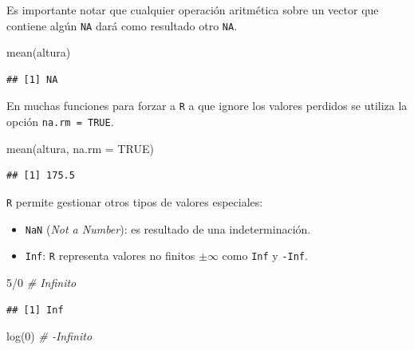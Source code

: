 \documentclass[
]{book}
\newenvironment{Shaded}{\begin{snugshade}}{\end{snugshade}}
\newcommand{\AttributeTok}[1]{\textcolor[rgb]{0.77,0.63,0.00}{#1}}
\newcommand{\CommentTok}[1]{\textcolor[rgb]{0.56,0.35,0.01}{\textit{#1}}}
\newcommand{\ConstantTok}[1]{\textcolor[rgb]{0.00,0.00,0.00}{#1}}
\newcommand{\DecValTok}[1]{\textcolor[rgb]{0.00,0.00,0.81}{#1}}
\newcommand{\FunctionTok}[1]{\textcolor[rgb]{0.00,0.00,0.00}{#1}}
\newcommand{\NormalTok}[1]{#1}
\newcommand{\SpecialCharTok}[1]{\textcolor[rgb]{0.00,0.00,0.00}{#1}}
\theoremstyle{break}
\theoremstyle{nonumberplain}
\begin{document}
Es importante notar que cualquier operación aritmética sobre un vector
que contiene algún \texttt{NA} dará como resultado otro \texttt{NA}.

\begin{Shaded}
\begin{Highlighting}[]
\FunctionTok{mean}\NormalTok{(altura)}
\end{Highlighting}
\end{Shaded}

\begin{verbatim}
## [1] NA
\end{verbatim}

En muchas funciones para forzar a \texttt{R} a que ignore los valores perdidos se utiliza la opción \texttt{na.rm\ =\ TRUE}.

\begin{Shaded}
\begin{Highlighting}[]
\FunctionTok{mean}\NormalTok{(altura, }\AttributeTok{na.rm =} \ConstantTok{TRUE}\NormalTok{)}
\end{Highlighting}
\end{Shaded}

\begin{verbatim}
## [1] 175.5
\end{verbatim}

\texttt{R} permite gestionar otros tipos de valores especiales:

\begin{itemize}
\item
  \texttt{NaN} (\emph{Not a Number}): es resultado de una indeterminación.
\item
  \texttt{Inf}: \texttt{R} representa valores no finitos \(\pm \infty\) como \texttt{Inf} y \texttt{-Inf}.
\end{itemize}

\vspace*{0.3cm}

\begin{Shaded}
\begin{Highlighting}[]
\DecValTok{5}\SpecialCharTok{/}\DecValTok{0}  \CommentTok{\# Infinito}
\end{Highlighting}
\end{Shaded}

\begin{verbatim}
## [1] Inf
\end{verbatim}

\begin{Shaded}
\begin{Highlighting}[]
\FunctionTok{log}\NormalTok{(}\DecValTok{0}\NormalTok{)  }\CommentTok{\# {-}Infinito}
\end{Highlighting}
\end{Shaded}
\end{document}
